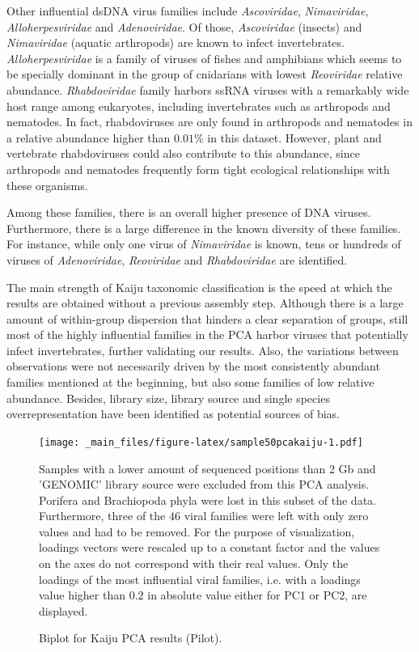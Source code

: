 \documentclass[
  openany]{book}
\begin{document}
Other influential dsDNA virus families include \emph{Ascoviridae}, \emph{Nimaviridae}, \emph{Alloherpesviridae} and \emph{Adenoviridae}. Of those, \emph{Ascoviridae} (insects) and \emph{Nimaviridae} (aquatic arthropods) are known to infect invertebrates. \emph{Alloherpesviridae} is a family of viruses of fishes and amphibians which seems to be specially dominant in the group of cnidarians with lowest \emph{Reoviridae} relative abundance. \emph{Rhabdoviridae} family harbors ssRNA viruses with a remarkably wide host range among eukaryotes, including invertebrates such as arthropods and nematodes. In fact, rhabdoviruses are only found in arthropods and nematodes in a relative abundance higher than \(0.01\%\) in this dataset. However, plant and vertebrate rhabdoviruses could also contribute to this abundance, since arthropods and nematodes frequently form tight ecological relationships with these organisms.

Among these families, there is an overall higher presence of DNA viruses. Furthermore, there is a large difference in the known diversity of these families. For instance, while only one virus of \emph{Nimaviridae} is known, tens or hundreds of viruses of \emph{Adenoviridae}, \emph{Reoviridae} and \emph{Rhabdoviridae} are identified.

The main strength of Kaiju taxonomic classification is the speed at which the results are obtained without a previous assembly step. Although there is a large amount of within-group dispersion that hinders a clear separation of groups, still most of the highly influential families in the PCA harbor viruses that potentially infect invertebrates, further validating our results. Also, the variations between observations were not necessarily driven by the most consistently abundant families mentioned at the beginning, but also some families of low relative abundance. Besides, library size, library source and single species overrepresentation have been identified as potential sources of bias.

\begin{figure}[!htbp]

\texttt{[image: \_main\_files/figure-latex/sample50pcakaiju-1.pdf]}

\caption{Biplot for Kaiju PCA results (Pilot).\label{fig:sample50pcakaiju}}
Samples with a lower amount of sequenced positions than 2 Gb and 'GENOMIC' library source were excluded from this PCA analysis. Porifera and Brachiopoda phyla were lost in this subset of the data. Furthermore, three of the $46$ viral families were left with only zero values and had to be removed. For the purpose of visualization, loadings vectors were rescaled up to a constant factor and the values on the axes do not correspond with their real values. Only the loadings of the most influential viral families, i.e. with a loadings value higher than $0.2$ in absolute value either for PC1 or PC2, are displayed.
\end{figure}
\end{document}
